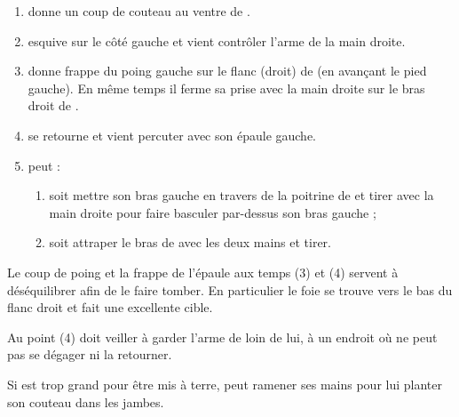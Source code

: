 \begin{technique}

\begin{enumerate}
	\item \A donne un coup de couteau au ventre de \D.
	
	\item \D esquive sur le côté gauche et vient contrôler l'arme de la main droite.
	
	\item \D donne frappe du poing gauche sur le flanc (droit) de \A (en avançant le pied gauche).
	En même temps il ferme sa prise avec la main droite sur le bras droit de \A.
	
	\item \D se retourne et vient percuter \A avec son épaule gauche.
	
	\item \D peut :
	\begin{enumerate}
		\item soit mettre son bras gauche en travers de la poitrine de \A et tirer avec la main droite pour faire basculer \A par-dessus son bras gauche ;
		
		\item soit attraper le bras de \A avec les deux mains et tirer.
	\end{enumerate}
\end{enumerate}

Le coup de poing et la frappe de l'épaule aux temps (3) et (4) servent à déséquilibrer \A afin de le faire tomber.
En particulier le foie se trouve vers le bas du flanc droit et fait une excellente cible.

Au point (4) \D doit veiller à garder l'arme de \A loin de lui, à un endroit où \A ne peut pas se dégager ni la retourner.

Si \A est trop grand pour être mis à terre, \D peut ramener ses mains pour lui planter son couteau dans les jambes.

\end{technique}


